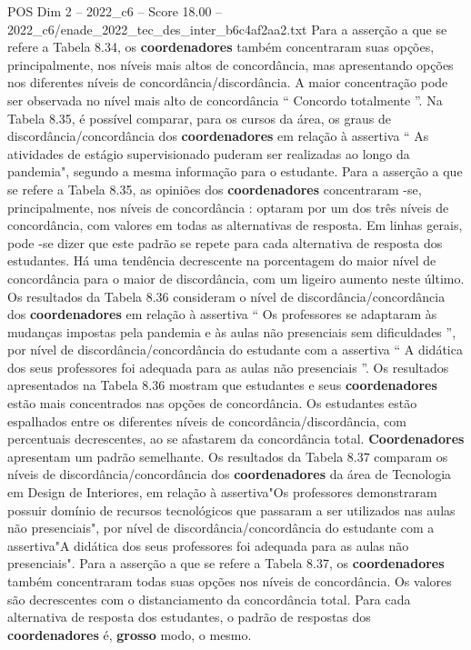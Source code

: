 \begin{textsample}{POS Dim 2 – 2022\_c6 – Score 18.00 – 2022\_c6/enade\_2022\_tec\_des\_inter\_b6c4af2aa2.txt}
Para a asserção a que se refere a Tabela 8.34, os \textbf{coordenadores} também concentraram suas opções, principalmente, nos níveis mais altos de concordância, mas apresentando opções nos diferentes níveis de concordância/discordância.
A maior concentração pode ser observada no nível mais alto de concordância “ Concordo totalmente ”.
Na Tabela 8.35, é possível comparar, para os cursos da área, os graus de discordância/concordância dos \textbf{coordenadores} em relação à assertiva “ As atividades de estágio supervisionado puderam ser realizadas ao longo da pandemia", segundo a mesma informação para o estudante.
Para a asserção a que se refere a Tabela 8.35, as opiniões dos \textbf{coordenadores} concentraram -se, principalmente, nos níveis de concordância : optaram por um dos três níveis de concordância, com valores em todas as alternativas de resposta.
Em linhas gerais, pode -se dizer que este padrão se repete para cada alternativa de resposta dos estudantes.
Há uma tendência decrescente na porcentagem do maior nível de concordância para o maior de discordância, com um ligeiro aumento neste último.
Os resultados da Tabela 8.36 consideram o nível de discordância/concordância dos \textbf{coordenadores} em relação à assertiva “ Os professores se adaptaram às mudanças impostas pela pandemia e às aulas não presenciais sem dificuldades ”, por nível de discordância/concordância do estudante com a assertiva “ A didática dos seus professores foi adequada para as aulas não presenciais ”.
Os resultados apresentados na Tabela 8.36 mostram que estudantes e seus \textbf{coordenadores} estão mais concentrados nas opções de concordância.
Os estudantes estão espalhados entre os diferentes níveis de concordância/discordância, com percentuais decrescentes, ao se afastarem da concordância total. \textbf{Coordenadores} apresentam um padrão semelhante.
Os resultados da Tabela 8.37 comparam os níveis de discordância/concordância dos \textbf{coordenadores} da área de Tecnologia em Design de Interiores, em relação à assertiva"Os professores demonstraram possuir domínio de recursos tecnológicos que passaram a ser utilizados nas aulas não presenciais", por nível de discordância/concordância do estudante com a assertiva"A didática dos seus professores foi adequada para as aulas não presenciais".
Para a asserção a que se refere a Tabela 8.37, os \textbf{coordenadores} também concentraram todas suas opções nos níveis de concordância.
Os valores são decrescentes com o distanciamento da concordância total.
Para cada alternativa de resposta dos estudantes, o padrão de respostas dos \textbf{coordenadores} é, \textbf{grosso} modo, o mesmo.

\end{textsample}
